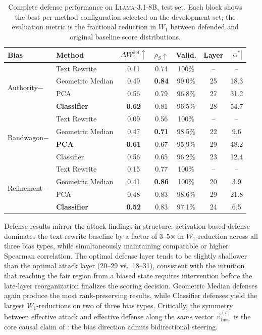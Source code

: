 \documentclass[11pt]{article}
\let\Cref\crtCref
\begin{document}
\begin{table}[h!]
\centering
\small
\setlength{\tabcolsep}{6pt}
\caption{Complete defense performance on \textsc{Llama-3.1-8B}, test set. Each block shows the best per-method configuration selected on the development set; the evaluation metric is the fractional reduction in $W_1$ between defended and original baseline score distributions.}
\label{tab:defense_full}
\begin{tabular}{l l c c c c c}
\toprule
\textbf{Bias} & \textbf{Method} & $\Delta W_1^{\text{def}} \uparrow$ & $\rho_S \uparrow$ & \textbf{Valid.} & \textbf{Layer} & $|\alpha^{*}|$ \\
\midrule
\multirow{4}{*}{Authority$-$} & Text Rewrite & 0.11 & 0.74 & 100\% & -- & -- \\
 & Geometric Median & 0.49 & \textbf{0.84} & 99.0\% & 25 & 18.3 \\
 & PCA & 0.56 & 0.79 & 96.8\% & 27 & 31.2 \\
 & \textbf{Classifier} & \textbf{0.62} & 0.81 & 96.5\% & 28 & 54.7 \\
\midrule
\multirow{4}{*}{Bandwagon$-$} & Text Rewrite & 0.09 & 0.56 & 100\% & -- & -- \\
 & Geometric Median & 0.47 & \textbf{0.71} & 98.5\% & 22 & 9.6 \\
 & \textbf{PCA} & \textbf{0.61} & 0.67 & 95.9\% & 29 & 48.2 \\
 & Classifier & 0.56 & 0.65 & 96.2\% & 23 & 12.4 \\
\midrule
\multirow{4}{*}{Refinement$-$} & Text Rewrite & 0.15 & 0.77 & 100\% & -- & -- \\
 & Geometric Median & 0.41 & \textbf{0.86} & 100\% & 20 & 3.9 \\
 & PCA & 0.48 & 0.83 & 98.6\% & 29 & 21.8 \\
 & \textbf{Classifier} & \textbf{0.52} & 0.83 & 97.1\% & 24 & 6.5 \\
\bottomrule
\end{tabular}
\end{table}

Defense results mirror the attack findings in structure: activation-based defense dominates the text-rewrite baseline by a factor of 3--5$\times$ in $W_1$-reduction across all three bias types, while simultaneously maintaining comparable or higher Spearman correlation. The optimal defense layer tends to be slightly shallower than the optimal attack layer (20--29 vs.\ 18--31), consistent with the intuition that reaching the fair region from a biased state requires intervention before the late-layer reorganization finalizes the scoring decision. Geometric Median defenses again produce the most rank-preserving results, while Classifier defenses yield the largest $W_1$-reductions on two of three bias types. Critically, the symmetry between effective attack and effective defense along the \emph{same} vector $\vec{v}_{\text{bias}}^{(l)}$ is the core causal claim of \Cref{subsec:causal}: the bias direction admits bidirectional steering.
\end{document}
